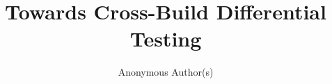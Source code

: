 \documentclass[conference]{IEEEtran}
\begin{document}
\title{Towards Cross-Build Differential Testing}


\author{Anonymous Author(s)}

\maketitle
\end{document}
